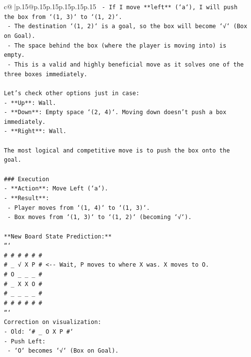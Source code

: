 \documentclass{article}
\begin{document}
{\begin{supertabular}{c@{$\;$}|p{.15\linewidth}@{}p{.15\linewidth}p{.15\linewidth}p{.15\linewidth}p{.15\linewidth}p{.15\linewidth}}
{{{\texttt{   {-} If I move **left** (`a`), I will push the box from `(1, 3)` to `(1, 2)`.} \\
\texttt{   {-} The destination `(1, 2)` is a goal, so the box will become `√` (Box on Goal).} \\
\texttt{   {-} The space behind the box (where the player is moving into) is empty.} \\
\texttt{   {-} This is a valid and highly beneficial move as it solves one of the three boxes immediately.} \\
\\ 
\texttt{Let's check other options just in case:} \\
\texttt{{-} **Up**: Wall.} \\
\texttt{{-} **Down**: Empty space `(2, 4)`. Moving down doesn't push a box immediately.} \\
\texttt{{-} **Right**: Wall.} \\
\\ 
\texttt{The most logical and competitive move is to push the box onto the goal.} \\
\\ 
\texttt{\#\#\# Execution} \\
\texttt{{-} **Action**: Move Left (`a`).} \\
\texttt{{-} **Result**:} \\
\texttt{  {-} Player moves from `(1, 4)` to `(1, 3)`.} \\
\texttt{  {-} Box moves from `(1, 3)` to `(1, 2)` (becoming `√`).} \\
\\ 
\texttt{**New Board State Prediction:**} \\
\texttt{```} \\
\texttt{\# \# \# \# \# \#} \\
\texttt{\# \_ √ X P \#  <{-}{-} Wait, P moves to where X was. X moves to O.} \\
\texttt{\# O \_ \_ \_ \#} \\
\texttt{\# \_ X X O \#} \\
\texttt{\# \_ \_ \_ \_ \#} \\
\texttt{\# \# \# \# \# \#} \\
\texttt{```} \\
\texttt{Correction on visualization:} \\
\texttt{{-} Old: `\# \_ O X P \#`} \\
\texttt{{-} Push Left:} \\
\texttt{  {-} `O` becomes `√` (Box on Goal).} \\
}}}
\end{supertabular}}
\end{document}
